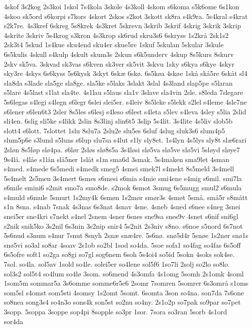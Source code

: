 {4skof
3s2kog
2s3koi
1skol
7s4kola
3skole
4s3koll
4skom
s6koma
s5k6ome
6s1kon
4skoo
sk5ord
s6korpi
s7kors
4skort
2skos
s2kot
3skott
sk8ra
s4k9ra.
5s4kral
s4krat
s2k7re.
4s3kref
6skreg
5s8krek
4s3kret
5skrevn
3skrib
3skrif
4skrig
3skrik
3skrip
4skrite
3skriv
5s4krog
s3kron
4s3krop
sk6rud
skru3s6
6skryss
1s2krå
2sk1s2
2sk3t4
5skud
1s4kue
sku4end
sku4er
skue5re
1skuf
5skulan
5skular
3skule
6s5kulis
4skull
s4kulp
4skult
skum3s
2skun
s6k5underv
4skup
8s5kurs
8skurv
2skv
sk5va.
3skvad
sk3vas
s6kven
sk3ver
sk5vit
3skvu
1sky
s6kya
s6kye
4skyr
sky3re
4skys
6s6kyss
5s6kysk
3skyt
6skæ
6skø.
6s5køa
4skøe
1skå
skå5re
6skåt
sl4
sla8da
s3lade
sla5ge
sla8ge.
sla5ke
s5laks
3slakt
3slal
4s3land
slap5pe
s5laran
s5lare
4s5last
s1lat
sla4te.
4s1lau
s5laus
sla1v
3slave
sla4vin
2sle.
s8leda
7slegare
5s6legas
s4legi
s4legn
s6legr
6slei
slei5er.
s4leiv
8s5leke
s5lekk
s2lel
s4leme
4sle7ne
s6lener
s6len6t3
2sler
8s5les
s6lesj
s4leso
s6lest
s4leta
s5lev
s4leva
4sley
s5lia
2slid
sli4en.
6slig
sli5ke
s4likk
2slin
8s3linj
slin6t5
3slip
5s4lit.
3s4lite
4s5liv
slob5b
slott4
s6lott.
7slottet
1slu
8slu7a
2slu2e
slu5es
6sluf
4slug
sluk3s6
slum4p5
slum5p6e
s3lund
s5luns
s6lup
slu7sa
s4lut
s1ly
sly8et.
1s4lyn
4s5lys
sly8t
slæ6rari
2sløn
8s5løp
slø4pa.
s6lør
2sløs
slø8s5a
3s4løsi
slø5va
slø5ve
slø5vi
5sløyd
sløye7
9s4lå.
s4låe
s1lån
slå5ner
1slåt
s1m
sma6d
3smak.
5s4maken
sma9let
4sman
s4med.
s4mede
6s5medi
s4medk
smeg5
4smei
smek7l
s4mekt
8s5meld
3s4mell
5s4melt
2s5men
3s4mert
6smes
s6mesi
s6mia
s4mie
smi4ene
s4mig
s6mil.
smi7la
s6mile
smini6
s2mit
smo7a
smo8de.
s2mok
6smot
3smug
6s5mugg
smul2
s6mula
s4muld
s6mule
5smurt
1s2my4k
6smøn
1s2mør
smør3s
4smøt
5små.
små5r
s8mått
s1n
8sna.
s4nab
7snak
4s3nas
6s3nat
4snav
4sne.
4sneb
4sned
s6nee
s4neg
3snei
snei5er
sne4kri
s7nekt
s4nel
2snem
4sner
6snes
sne9sa
snes9v
4snet
s6nif
sni6gl
s2nik
snik5ko
3s2nil
6s3nin
3s2nip
snir4
5s2nit
2s3niv
s8no.
s6noe
s5nord
6s7not
5s6nud
s3num
s4nur
7snut
8snyh
2snæ
snæ4re.
5s6nø.
snø5d4r
5snøe
1s2nør
snø1s
snø5vi
so3al
so8ar
4soav
2s1ob
so2bl
1sod
so4da.
5soe
sofa1
so4fag
so4fas
6s5off
6s5ofre
soft1
so2ga
so8gi
so7gl
sog6nem
6soh
5s4oi4
so5id
5sokn
4soks
sok4se.
7sol.
so4la.
sol5av
1sold
so4le.
solei5er
so4lene
sol5f6
1so7li
2solj
so2lo
so8lo.
sol3s2
sol5t4
so4lum
so4lø
3som.
so6mend
4s3omfa
4s1omg
5somh
2s1omk
4soml
1som5m
sommar5a
3s6omme
somme6r5e6
2somr
7somren
5somrer
6s3områ
s1oms
som5sl
s4omst
som5sti
4somsy
1s2omt
5somt.
6somta
3son
so4na.
son7da
7s6one
so8nea
song3s4
so4n3o
sons4k
son5st
so2nu
so4ny.
2s1o2p
so7pak
so9par
so7pet
3sopp.
5soppa
3soppe
sop4pi
8sopple
so3pr
1sor.
7sora
so3ran
5sorb
4s1ord
sor4da
}
